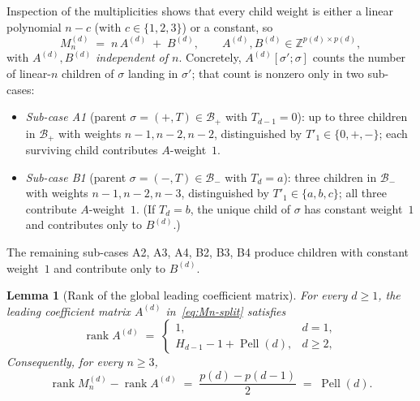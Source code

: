 \documentclass{amsart}
\newtheorem{lemma}[theorem]{Lemma}
\theoremstyle{definition}
\theoremstyle{remark}
\newcommand{\Z}{\mathbb{Z}}
\DeclareMathOperator{\rank}{rank}
\DeclareMathOperator{\Pell}{Pell}
\begin{document}
Inspection of the multiplicities shows that every child weight is
either a linear polynomial $n - c$ (with $c \in \{1, 2, 3\}$) or a
constant, so
\begin{equation}\label{eq:Mn-split}
  M_n^{(d)} \;=\; n \, A^{(d)} \;+\; B^{(d)},
  \qquad A^{(d)}, B^{(d)} \in \Z^{p(d) \times p(d)},
\end{equation}
with $A^{(d)}, B^{(d)}$ \emph{independent of $n$}.  Concretely,
$A^{(d)}[\sigma'; \sigma]$ counts the number of linear-$n$ children
of $\sigma$ landing in $\sigma'$; that count is nonzero only in
two sub-cases:
\begin{itemize}
\item \emph{Sub-case A1} (parent $\sigma = (+, T) \in \mathcal{B}_+$
  with $T_{d-1} = 0$): up to three children in $\mathcal{B}_+$ with
  weights $n-1, n-2, n-2$, distinguished by $T'_1 \in \{0, +, -\}$;
  each surviving child contributes $A$-weight~$1$.
\item \emph{Sub-case B1} (parent $\sigma = (-, T) \in \mathcal{B}_-$
  with $T_d = a$): three children in $\mathcal{B}_-$ with weights
  $n-1, n-2, n-3$, distinguished by $T'_1 \in \{a, b, c\}$;
  all three contribute $A$-weight~$1$.  (If $T_d = b$, the unique
  child of $\sigma$ has constant weight~$1$ and contributes only
  to $B^{(d)}$.)
\end{itemize}
The remaining sub-cases A2, A3, A4, B2, B3, B4 produce children
with constant weight~$1$ and contribute only to $B^{(d)}$.

\begin{lemma}[Rank of the global leading coefficient matrix]
\label{lem:global-A-rank}
For every $d \ge 1$, the leading coefficient matrix $A^{(d)}$
in~\eqref{eq:Mn-split} satisfies
\begin{equation}\label{eq:global-A-rank}
  \rank A^{(d)}
  \;=\;
  \begin{cases}
    1, & d=1,\\
    H_{d-1}-1+\Pell(d), & d\ge 2,
  \end{cases}
\end{equation}
Consequently, for every $n \ge 3$,
\begin{equation}\label{eq:rank-M-minus-rank-A}
  \rank M_n^{(d)} - \rank A^{(d)}
  \;=\; \frac{p(d)-p(d{-}1)}{2}
  \;=\; \Pell(d).
\end{equation}
\end{lemma}
\end{document}
